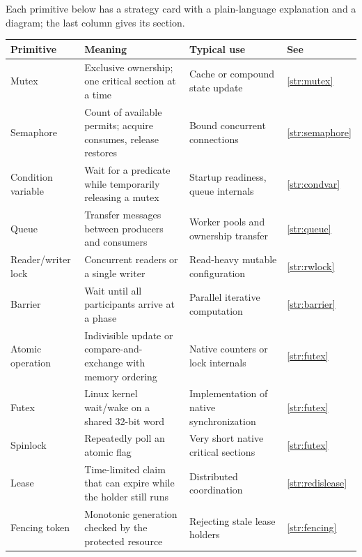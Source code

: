 \documentclass[11pt,openany]{book}
\begin{document}
Each primitive below has a strategy card with a plain-language explanation and a diagram; the last column gives its section.
\begin{longtable}{L{.19\linewidth}L{.34\linewidth}L{.29\linewidth}L{.07\linewidth}}
\toprule Primitive & Meaning & Typical use & See \\ \midrule\endhead
Mutex & Exclusive ownership; one critical section at a time & Cache or compound state update & \ref{str:mutex} \\
Semaphore & Count of available permits; acquire consumes, release restores & Bound concurrent connections & \ref{str:semaphore} \\
Condition variable & Wait for a predicate while temporarily releasing a mutex & Startup readiness, queue internals & \ref{str:condvar} \\
Queue & Transfer messages between producers and consumers & Worker pools and ownership transfer & \ref{str:queue} \\
Reader/writer lock & Concurrent readers or a single writer & Read-heavy mutable configuration & \ref{str:rwlock} \\
Barrier & Wait until all participants arrive at a phase & Parallel iterative computation & \ref{str:barrier} \\
Atomic operation & Indivisible update or compare-and-exchange with memory ordering & Native counters or lock internals & \ref{str:futex} \\
Futex & Linux kernel wait/wake on a shared 32-bit word & Implementation of native synchronization & \ref{str:futex} \\
Spinlock & Repeatedly poll an atomic flag & Very short native critical sections & \ref{str:futex} \\
Lease & Time-limited claim that can expire while the holder still runs & Distributed coordination & \ref{str:redislease} \\
Fencing token & Monotonic generation checked by the protected resource & Rejecting stale lease holders & \ref{str:fencing} \\
\bottomrule
\end{longtable}
\end{document}
